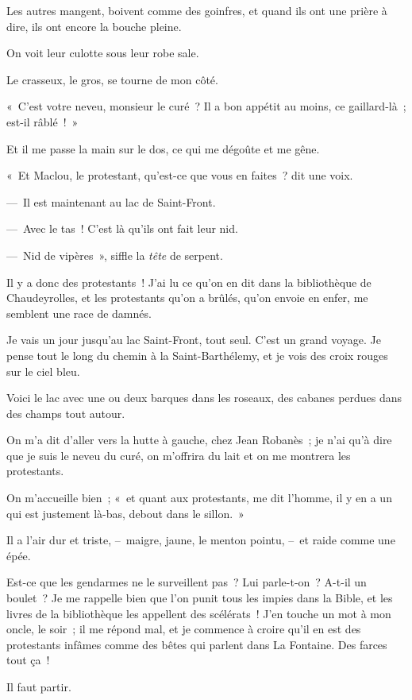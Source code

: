 \documentclass[french,twoside]{book} %
\begin{document}
Les autres mangent, boivent comme des goinfres, et quand ils ont une prière à dire, ils ont encore la bouche pleine.\par
On voit leur culotte sous leur robe sale.\par
Le crasseux, le gros, se tourne de mon côté.\par
« C’est votre neveu, monsieur le curé ? Il a bon appétit au moins, ce gaillard-là ; est-il râblé ! »\par
Et il me passe la main sur le dos, ce qui me dégoûte et me gêne.\par
\bigbreak
\noindent « Et Maclou, le protestant, qu’est-ce que vous en faites ? dit une voix.\par
— Il est maintenant au lac de Saint-Front.\par
— Avec le tas ! C’est là qu’ils ont fait leur nid.\par
— Nid de vipères », siffle la \emph{tête} de serpent.\par
Il y a donc des protestants ! J’ai lu ce qu’on en dit dans la bibliothèque de Chaudeyrolles, et les protestants qu’on a brûlés, qu’on envoie en enfer, me semblent une race de damnés.\par
Je vais un jour jusqu’au lac Saint-Front, tout seul. C’est un grand voyage. Je pense tout le long du chemin à la Saint-Barthélemy, et je vois des croix rouges sur le ciel bleu.\par
Voici le lac avec une ou deux barques dans les roseaux, des cabanes perdues dans des champs tout autour.\par
On m’a dit d’aller vers la hutte à gauche, chez Jean Robanès ; je n’ai qu’à dire que je suis le neveu du curé, on m’offrira du lait et on me montrera les protestants.\par
On m’accueille bien ; « et quant aux protestants, me dit l’homme, il y en a un qui est justement là-bas, debout dans le sillon. »\par
Il a l’air dur et triste, – maigre, jaune, le menton pointu, – et raide comme une épée.\par
Est-ce que les gendarmes ne le surveillent pas ? Lui parle-t-on ? A-t-il un boulet ? Je me rappelle bien que l’on punit tous les impies dans la Bible, et les livres de la bibliothèque les appellent des scélérats ! J’en touche un mot à mon oncle, le soir ; il me répond mal, et je commence à croire qu’il en est des protestants infâmes comme des bêtes qui parlent dans La Fontaine. Des farces tout ça !\par
\bigbreak
\noindent Il faut partir.\par
\end{document}
